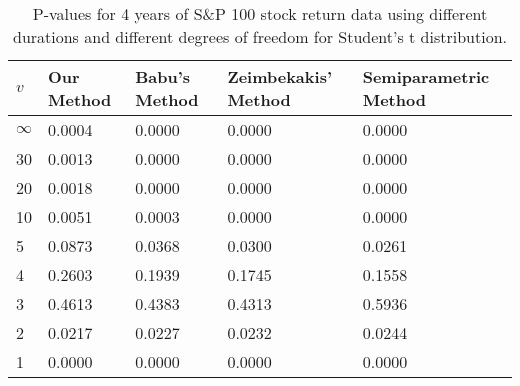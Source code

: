 \begin{table}[ht]
\centering
\caption{P-values for 4 years of S\&P 100 stock return 
                   data using different durations
  and different degrees of freedom for Student's t distribution.} 
\label{table:SP1004}
\begin{tabular}{lllll}
  \hline
$v$ & Our Method & Babu's Method & Zeimbekakis' Method & Semiparametric Method \\ 
  \hline
$\infty$ & 0.0004 & 0.0000 & 0.0000 & 0.0000 \\ 
  30 & 0.0013 & 0.0000 & 0.0000 & 0.0000 \\ 
  20 & 0.0018 & 0.0000 & 0.0000 & 0.0000 \\ 
  10 & 0.0051 & 0.0003 & 0.0000 & 0.0000 \\ 
  5 & 0.0873 & 0.0368 & 0.0300 & 0.0261 \\ 
  4 & 0.2603 & 0.1939 & 0.1745 & 0.1558 \\ 
  3 & 0.4613 & 0.4383 & 0.4313 & 0.5936 \\ 
  2 & 0.0217 & 0.0227 & 0.0232 & 0.0244 \\ 
  1 & 0.0000 & 0.0000 & 0.0000 & 0.0000 \\ 
   \hline
\end{tabular}
\end{table}

